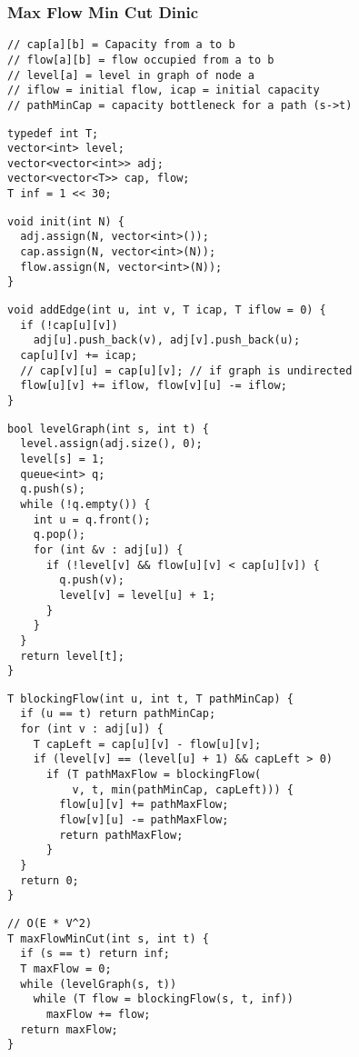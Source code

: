 \documentclass[twoside]{article}
\begin{document}
\begin{multicols*}{2}
{\subsubsection*{Max Flow Min Cut Dinic}
}
\begin{verbatim}
// cap[a][b] = Capacity from a to b
// flow[a][b] = flow occupied from a to b
// level[a] = level in graph of node a
// iflow = initial flow, icap = initial capacity
// pathMinCap = capacity bottleneck for a path (s->t)
\end{verbatim}
\vspace{-12pt}
\begin{verbatim}
typedef int T;
vector<int> level;
vector<vector<int>> adj;
vector<vector<T>> cap, flow;
T inf = 1 << 30;
\end{verbatim}
\vspace{-12pt}
\begin{verbatim}
void init(int N) {
  adj.assign(N, vector<int>());
  cap.assign(N, vector<int>(N));
  flow.assign(N, vector<int>(N));
}
\end{verbatim}
\vspace{-12pt}
\begin{verbatim}
void addEdge(int u, int v, T icap, T iflow = 0) {
  if (!cap[u][v])
    adj[u].push_back(v), adj[v].push_back(u);
  cap[u][v] += icap;
  // cap[v][u] = cap[u][v]; // if graph is undirected
  flow[u][v] += iflow, flow[v][u] -= iflow;
}
\end{verbatim}
\vspace{-12pt}
\begin{verbatim}
bool levelGraph(int s, int t) {
  level.assign(adj.size(), 0);
  level[s] = 1;
  queue<int> q;
  q.push(s);
  while (!q.empty()) {
    int u = q.front();
    q.pop();
    for (int &v : adj[u]) {
      if (!level[v] && flow[u][v] < cap[u][v]) {
        q.push(v);
        level[v] = level[u] + 1;
      }
    }
  }
  return level[t];
}
\end{verbatim}
\vspace{-12pt}
\begin{verbatim}
T blockingFlow(int u, int t, T pathMinCap) {
  if (u == t) return pathMinCap;
  for (int v : adj[u]) {
    T capLeft = cap[u][v] - flow[u][v];
    if (level[v] == (level[u] + 1) && capLeft > 0)
      if (T pathMaxFlow = blockingFlow(
          v, t, min(pathMinCap, capLeft))) {
        flow[u][v] += pathMaxFlow;
        flow[v][u] -= pathMaxFlow;
        return pathMaxFlow;
      }
  }
  return 0;
}
\end{verbatim}
\vspace{-12pt}
\begin{verbatim}
// O(E * V^2)
T maxFlowMinCut(int s, int t) {
  if (s == t) return inf;
  T maxFlow = 0;
  while (levelGraph(s, t))
    while (T flow = blockingFlow(s, t, inf))
      maxFlow += flow;
  return maxFlow;
}
\end{verbatim}


\end{multicols*}
\end{document}
